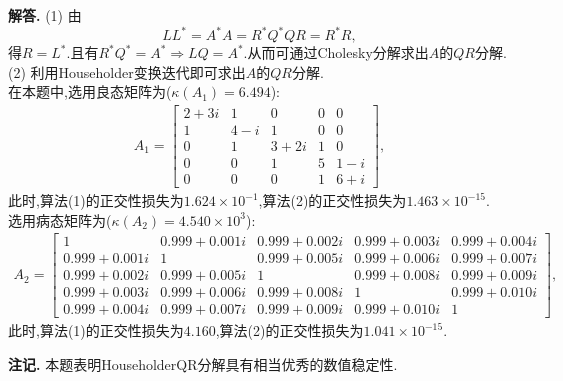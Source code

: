 \documentclass[12pt, a4paper, oneside, UTF8]{ctexart}
\newenvironment{solution}{\par\noindent\textbf{解答. }}{\par}
\newenvironment{note}{\par\noindent\textbf{注记. }}{\par}
\begin{document}
\begin{solution}
    (1) 由$$LL^*=A^*A=R^*Q^*QR=R^*R,$$得$R=L^*$.且有${R^*Q^*=A^*}\Rightarrow{LQ=A^*}$.从而可通过Cholesky分解求出$A$的$QR$分解.\\
    (2) 利用Householder变换迭代即可求出$A$的$QR$分解.\\
    
    在本题中,选用良态矩阵为($\kappa(A_1)=6.494$):
    \begin{align*}
        A_1 =
        \left[
            \begin{array}{ccccc}	
                2 + 3i & 1 & 0 & 0 & 0 \\
                1 & 4 - i & 1 & 0 & 0 \\
                0 & 1 & 3 + 2i & 1 & 0 \\
                0 & 0 & 1 & 5 & 1 - i \\
                0 & 0 & 0 & 1 & 6 + i
            \end{array}
        \right],
    \end{align*}
    此时,算法(1)的正交性损失为$1.624\times{10^{-1}}$,算法(2)的正交性损失为$1.463\times{10^{-15}}$.\\
    
    选用病态矩阵为($\kappa(A_2)=4.540\times{10^{3}}$):
    \begin{align*}
        A_2 =
        \left[
            \begin{array}{ccccc}	
                1 & 0.999 + 0.001i & 0.999 + 0.002i & 0.999 + 0.003i & 0.999 + 0.004i \\
                0.999 + 0.001i & 1 & 0.999 + 0.005i & 0.999 + 0.006i & 0.999 + 0.007i \\
                0.999 + 0.002i & 0.999 + 0.005i & 1 & 0.999 + 0.008i & 0.999 + 0.009i \\
                0.999 + 0.003i & 0.999 + 0.006i & 0.999 + 0.008i & 1 & 0.999 + 0.010i \\
                0.999 + 0.004i & 0.999 + 0.007i & 0.999 + 0.009i & 0.999 + 0.010i & 1
            \end{array}
        \right],
    \end{align*}
    此时,算法(1)的正交性损失为$4.160$,算法(2)的正交性损失为$1.041\times{10^{-15}}$.
\end{solution}

\begin{note}
    本题表明HouseholderQR分解具有相当优秀的数值稳定性.
\end{note}
\end{document}
